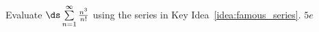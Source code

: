{Evaluate $\ds \sum\limits_{n=1}^\infty \frac{n^3}{n!}$ using the series in Key Idea~\ref{idea:famous_series}.
}
{$5e$
}